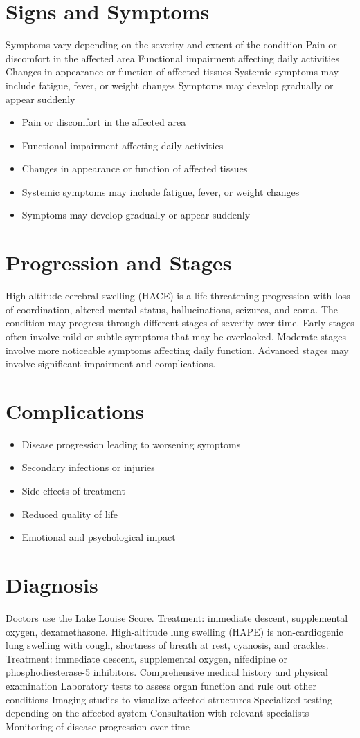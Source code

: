 \section{Signs and Symptoms}
Symptoms vary depending on the severity and extent of the condition Pain or discomfort in the affected area Functional impairment affecting daily activities Changes in appearance or function of affected tissues Systemic symptoms may include fatigue, fever, or weight changes Symptoms may develop gradually or appear suddenly

\begin{itemize}[noitemsep]
  \item Pain or discomfort in the affected area
  \item Functional impairment affecting daily activities
  \item Changes in appearance or function of affected tissues
  \item Systemic symptoms may include fatigue, fever, or weight changes
  \item Symptoms may develop gradually or appear suddenly
\end{itemize}
\section{Progression and Stages}
High-altitude cerebral swelling (HACE) is a life-threatening progression with loss of coordination, altered mental status, hallucinations, seizures, and coma. The condition may progress through different stages of severity over time. Early stages often involve mild or subtle symptoms that may be overlooked. Moderate stages involve more noticeable symptoms affecting daily function. Advanced stages may involve significant impairment and complications.
\section{Complications}
\begin{itemize}[noitemsep]
  \item Disease progression leading to worsening symptoms
  \item Secondary infections or injuries
  \item Side effects of treatment
  \item Reduced quality of life
  \item Emotional and psychological impact
\end{itemize}
\section{Diagnosis}
Doctors use the Lake Louise Score. Treatment: immediate descent, supplemental oxygen, dexamethasone. High-altitude lung swelling (HAPE) is non-cardiogenic lung swelling with cough, shortness of breath at rest, cyanosis, and crackles. Treatment: immediate descent, supplemental oxygen, nifedipine or phosphodiesterase-5 inhibitors. Comprehensive medical history and physical examination Laboratory tests to assess organ function and rule out other conditions Imaging studies to visualize affected structures Specialized testing depending on the affected system Consultation with relevant specialists Monitoring of disease progression over time

